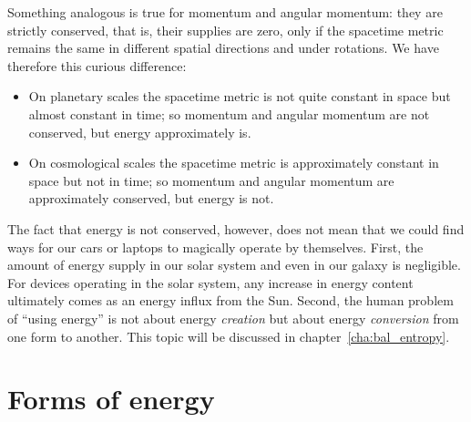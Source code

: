 \documentclass[a4paper,12pt,%
onecolumn,oneside,%
british%
]{memoir}
\newcommand{\mynotew}[1]{{\footnotesize\color{midgrey}\faIcon{tools}\ #1}}
\renewcommand*{\|}[1][]{\nonscript\:#1\vert\nonscript\:\mathopen{}}
\newcommand*{\chap}{chapter}%
\begin{document}
\medskip

Something analogous is true for momentum and angular momentum: they are strictly conserved, that is, their supplies are zero, only if the spacetime metric remains the same in different spatial directions and under rotations. We have therefore this curious difference:
\begin{itemize}
\item On planetary scales the spacetime metric is not quite constant in space but almost constant in time; so momentum and angular momentum are not conserved, but energy approximately is.
\item On cosmological scales the spacetime metric is approximately constant in space but not in time; so momentum and angular momentum are approximately conserved, but energy is not.
\end{itemize}

\medskip

The fact that energy is not conserved, however, does not mean that we could find ways for our cars or laptops to magically operate by themselves. First, the amount of energy supply in our solar system and even in our galaxy is negligible. %
For devices operating in the solar system, any increase in energy content ultimately comes as an energy influx from the Sun. Second, the human problem of \enquote{using energy} is not about energy \emph{creation} but about energy \emph{conversion} from one form to another. This topic will be discussed in \chap~\ref{cha:bal_entropy}.



\section{Forms of energy}
\label{sec:energy_forms}
\end{document}
